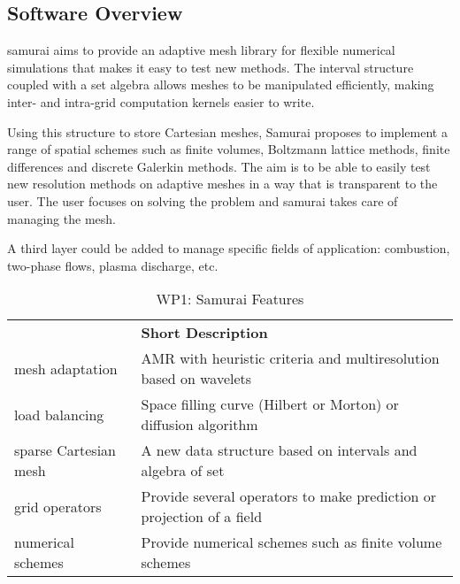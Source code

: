 \subsection{Software Overview}
\label{sec:WP1:Samurai:summary}

samurai aims to provide an adaptive mesh library for flexible numerical simulations that makes it easy to test new methods. The interval structure coupled with a set algebra allows meshes to be manipulated efficiently, making inter- and intra-grid computation kernels easier to write.

Using this structure to store Cartesian meshes, Samurai proposes to implement a range of spatial schemes such as finite volumes, Boltzmann lattice methods, finite differences and discrete Galerkin methods. The aim is to be able to easily test new resolution methods on adaptive meshes in a way that is transparent to the user. The user focuses on solving the problem and samurai takes care of managing the mesh.

A third layer could be added to manage specific fields of application: combustion, two-phase flows, plasma discharge, etc.

\begin{table}[h!]
    \centering
    {
        \setlength{\parindent}{0pt}
        \def\arraystretch{1.25}
        {
            \fontsize{9}{11}\selectfont
            \begin{tabular}{!{\color{numpexgray}\vrule}p{.25\linewidth}!{\color{numpexgray}\vrule}p{.6885\linewidth}!{\color{numpexgray}\vrule}}

     &  {\rule{0pt}{2.5ex}\color{white}\bf Short Description }\\

        mesh adaptation & AMR with heuristic criteria and multiresolution based on wavelets \\
       load balancing & Space filling curve (Hilbert or Morton) or diffusion algorithm \\
       sparse Cartesian mesh & A new data structure based on intervals and algebra of set \\
       grid operators & Provide several operators to make prediction or projection of a field \\
      numerical schemes & Provide numerical schemes such as finite volume schemes \\


\end{tabular}
        }
    }
    \caption{WP1: Samurai Features}
    \label{tab:WP1:Samurai:features}
\end{table}



